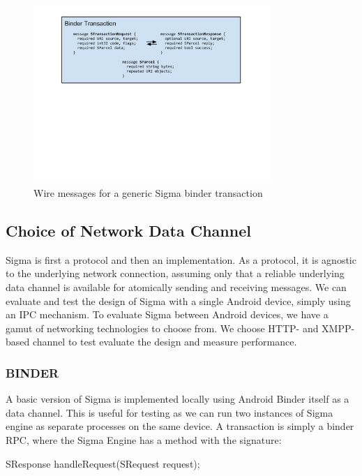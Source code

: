 \documentclass[prodmode]{acmlarge}
\begin{document}
\begin{figure}[h!]
\centering
\includegraphics[width=0.8\textwidth]{drawings/WireBinderTransaction.pdf}
\caption{Wire messages for a generic Sigma binder transaction}
\label{fig:GenericSigmaBinderTransaction}
\end{figure}

\subsection{Choice of Network Data Channel}
Sigma is first a protocol and then an implementation. As a protocol, it is agnostic to the underlying network connection, assuming only that a reliable underlying data channel is available for atomically sending and receiving messages. We can evaluate and test the design of Sigma with a single Android device, simply using an IPC mechanism. To evaluate Sigma between Android devices, we have a gamut of networking technologies to choose from. We choose HTTP- and XMPP- based channel to test evaluate the design and measure performance.

\subsubsection{BINDER}
A basic version of Sigma is implemented locally using Android Binder itself as a data channel. This is useful for testing as we can run two instances of Sigma engine as separate processes on the same device. A transaction is simply a binder RPC, where the Sigma Engine has a method with the signature:

\begin{snippet}
SResponse handleRequest(SRequest request);
\end{snippet}
\end{document}
